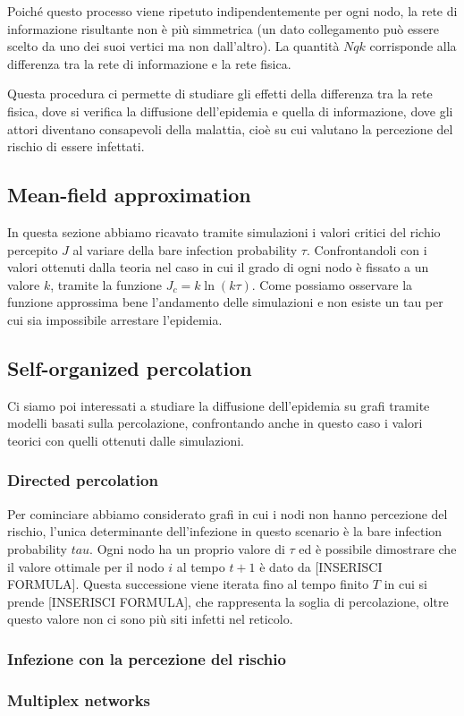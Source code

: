 Poiché questo processo viene ripetuto indipendentemente per ogni nodo, la rete di informazione risultante non è più
simmetrica (un dato collegamento può essere scelto da uno dei suoi vertici ma non dall'altro).
La quantità $Nqk$ corrisponde alla differenza tra la rete di informazione e la rete fisica.

Questa procedura ci permette di studiare gli effetti della differenza tra la rete fisica, dove si verifica la
diffusione dell'epidemia e quella di informazione, dove gli attori diventano consapevoli della malattia,
cioè su cui valutano la percezione del rischio di essere infettati.

\subsection{Mean-field approximation}\label{subsec:mean-field-approximation}
In questa sezione abbiamo ricavato tramite simulazioni i valori critici del richio percepito $J$
al variare della bare infection probability $\tau$. Confrontandoli con i valori ottenuti dalla teoria nel caso
in cui il grado di ogni nodo è fissato a  un valore $k$, tramite la funzione $J_{c}=k\ln(k\tau)$.
Come possiamo osservare la funzione approssima bene l'andamento delle simulazioni e non esiste un tau per cui 
sia impossibile arrestare l'epidemia. 
\subsection{Self-organized percolation}\label{subsec:self-organized-percolation}
Ci siamo poi interessati a studiare la diffusione dell'epidemia su grafi tramite modelli basati 
sulla percolazione, confrontando anche in questo caso i valori teorici con quelli ottenuti dalle simulazioni.

\subsubsection{Directed percolation}\label{subsubsec:directed-percolation}
Per cominciare abbiamo considerato grafi in cui i nodi non hanno percezione del rischio, l'unica determinante 
dell'infezione in questo scenario è la bare infection probability $tau$. Ogni nodo ha un proprio valore di $\tau$
ed è possibile dimostrare che il valore ottimale per il nodo $i$ al tempo $t+1$ è dato da [INSERISCI FORMULA].
Questa successione viene iterata fino al tempo finito $T$ in cui si prende [INSERISCI FORMULA], che 
rappresenta la soglia di percolazione, oltre questo valore non ci sono più siti infetti nel reticolo.
\subsubsection{Infezione con la percezione del rischio}\label{subsubsec:infezione-con-la-percezione-del-rischio}

\subsubsection{Multiplex networks}\label{subsubsec:multiplex-networks}